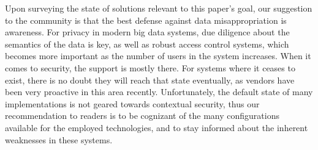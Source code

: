 \documentclass{sigchi}
\begin{document}
Upon surveying the state of solutions relevant to this paper's goal, our suggestion to the community is that the best defense against data misappropriation is awareness. For privacy in modern big data systems, due diligence about the semantics of the data is key, as well as robust access control systems, which becomes more important as the number of users in the system increases. When it comes to security, the support is mostly there. For systems where it ceases to exist, there is no doubt they will reach that state eventually, as vendors have been very proactive in this area recently. Unfortunately, the default state of many implementations is not geared towards contextual security, thus our recommendation to readers is to be cognizant of the many configurations available for the employed technologies, and to stay informed about the inherent weaknesses in these systems.

%
{\footnotesize 
}

 
\end{document}
